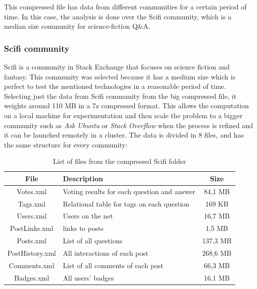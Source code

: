 \documentclass[11pt]{article} %
\begin{document}
    This compressed file has data from different communities for a certain period of time. In this case, the analysis is done over the Scifi community, which is a median size community for science-fiction Q\&A.

    \subsubsection{Scifi community}

    Scifi is a community in Stack Exchange that focuses on science fiction and fantasy. This community was selected because it has a medium size which is perfect to test the mentioned technologies in a reasonable period of time. Selecting just the data from Scifi community from the big compressed file, it weights around 110 MB in a 7z compressed format. This allows the computation on a local machine for experimentation and then scale the problem to a bigger community such as \emph{Ask Ubuntu} or \emph{Stack Overflow} when the process is refined and it can be launched remotely in a cluster. The data is divided in 8 files, and has the same structure for every community:

    \begin{table}[!h]
      \centering
      \begin{tabular}{|c|p{}|c|}
        \hline

        File & Description & Size \\ \hline
        Votes.xml & Voting results for each question and answer & 84,1 MB \\ \hline
        Tags.xml & Relational table for tags on each question & 169 KB \\ \hline
        Users.xml & Users on the net & 16,7 MB \\ \hline
        PostLinks.xml & links to posts & 1,5 MB \\ \hline
        Posts.xml & List of all questions & 137,3 MB \\ \hline
        PostHistory.xml & All interactions of each post & 268,6 MB \\ \hline
        Comments.xml & List of all comments of each post & 66,3 MB \\ \hline
        Badges.xml & All users' badges & 16,1 MB \\

        \hline
      \end{tabular}
      \caption{List of files from the compressed Scifi folder}
      \label{tab:list_of_files}
    \end{table}
\end{document}
